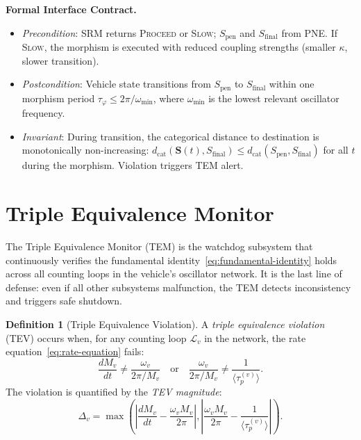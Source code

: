 \documentclass[twocolumn,10pt]{article}
\theoremstyle{definition}
\newtheorem{definition}[theorem]{Definition}
\newcommand{\Sentropy}{\mathbf{S}}
\newcommand{\dcat}{d_{\mathrm{cat}}}
\newcommand{\taup}{\tau_p}
\newcommand{\Sfinal}{S_{\mathrm{final}}}
\newcommand{\Spen}{S_{\mathrm{pen}}}
\begin{document}
\textbf{Formal Interface Contract.}
\begin{itemize}[leftmargin=*]
\item \emph{Precondition}: SRM returns \textsc{Proceed} or \textsc{Slow}; $\Spen$ and $\Sfinal$ from PNE. If \textsc{Slow}, the morphism is executed with reduced coupling strengths (smaller $\kappa$, slower transition).
\item \emph{Postcondition}: Vehicle state transitions from $\Spen$ to $\Sfinal$ within one morphism period $\tau_\varphi \leq 2\pi/\omega_{\min}$, where $\omega_{\min}$ is the lowest relevant oscillator frequency.
\item \emph{Invariant}: During transition, the categorical distance to destination is monotonically non-increasing: $\dcat(\Sentropy(t), \Sfinal) \leq \dcat(\Spen, \Sfinal)$ for all $t$ during the morphism. Violation triggers TEM alert.
\end{itemize}


\section{Triple Equivalence Monitor}
\label{sec:tem}

The Triple Equivalence Monitor (TEM) is the watchdog subsystem that continuously verifies the fundamental identity~\eqref{eq:fundamental-identity} holds across all counting loops in the vehicle's oscillator network. It is the last line of defense: even if all other subsystems malfunction, the TEM detects inconsistency and triggers safe shutdown.

\begin{definition}[Triple Equivalence Violation]
\label{def:tev}
A \emph{triple equivalence violation} (TEV) occurs when, for any counting loop $\mathcal{L}_v$ in the network, the rate equation~\eqref{eq:rate-equation} fails:
\begin{equation}
\frac{dM_v}{dt} \neq \frac{\omega_v}{2\pi / M_v} \quad \text{or} \quad \frac{\omega_v}{2\pi / M_v} \neq \frac{1}{\langle \taup^{(v)} \rangle}.
\label{eq:tev-condition}
\end{equation}
The violation is quantified by the \emph{TEV magnitude}:
\begin{equation}
\Delta_v = \max\left(\left|\frac{dM_v}{dt} - \frac{\omega_v M_v}{2\pi}\right|, \left|\frac{\omega_v M_v}{2\pi} - \frac{1}{\langle \taup^{(v)} \rangle}\right|\right).
\end{equation}
\end{definition}
\end{document}
